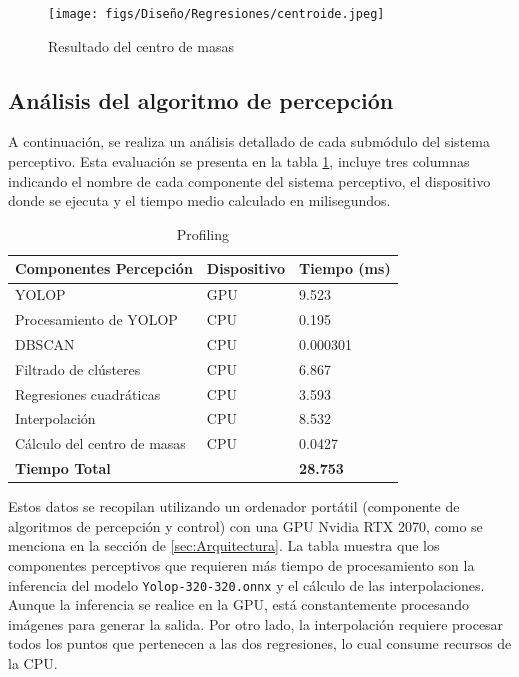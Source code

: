  \begin{figure} [H]
    \begin{center}
      \texttt{[image: figs/Diseño/Regresiones/centroide.jpeg]}
    \end{center}
    \caption{Resultado del centro de masas}
    \label{fig:centro de masas}
    \vspace{-1.5em}
  \end{figure}

  \subsection{Análisis del algoritmo de percepción}
  \label{sec:Análisis del algoritmo de percepción}
  A continuación, se realiza un análisis detallado de cada submódulo del sistema perceptivo. Esta evaluación se presenta en la tabla \ref{tab:Profiling}, incluye 
  tres columnas indicando el nombre  de cada componente del sistema perceptivo, el dispositivo donde se ejecuta y el tiempo medio calculado en milisegundos.

\begin{table}[h]
    \centering
    \begin{tabular}{| m{5cm} | m{3cm} | m{3cm} |}
        \hline
        \textbf{Componentes Percepción} & \textbf{Dispositivo} & \textbf{Tiempo (ms)} \\ \hline
        YOLOP & GPU & 9.523 \\ \hline
        Procesamiento de YOLOP & CPU & 0.195 \\ \hline
        DBSCAN & CPU & 0.000301 \\ \hline
        Filtrado de clústeres & CPU & 6.867 \\ \hline
        Regresiones cuadráticas & CPU & 3.593 \\ \hline
        Interpolación & CPU & 8.532 \\ \hline
        Cálculo del centro de masas & CPU & 0.0427 \\ \hline
        \textbf{Tiempo Total} & & \textbf{28.753} \\ \hline
    \end{tabular}
    \caption{Profiling}
    \label{tab:Profiling}
\end{table}

Estos datos se recopilan utilizando un ordenador portátil (componente de algoritmos de percepción y control) con una GPU Nvidia RTX 2070, como se menciona en la sección de \ref{sec:Arquitectura}. La tabla muestra que los 
componentes perceptivos que requieren más tiempo de procesamiento son la inferencia del modelo \texttt{Yolop-320-320.onnx} y el cálculo de las interpolaciones. 
Aunque la inferencia se realice en la GPU, está constantemente procesando imágenes para generar la salida. Por otro lado, la interpolación 
requiere procesar todos los puntos que pertenecen a las dos regresiones, lo cual consume recursos de la CPU.

